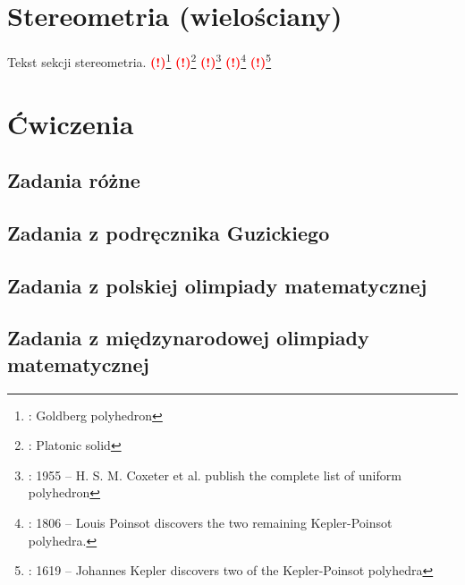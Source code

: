 \documentclass{greaseproof}
\newcommand{\todofoot}[1]{\textcolor{red}{\textbf{(!)}\footnote{\textbf{\color{red}{Do zrobienia}}: #1}}}
\begin{document}
\chapter{Stereometria (wielościany)}
Tekst sekcji stereometria.
\todofoot{Goldberg polyhedron} %
\todofoot{Platonic solid} %
\todofoot{1955 – H. S. M. Coxeter et al. publish the complete list of uniform polyhedron}
\todofoot{1806 – Louis Poinsot discovers the two remaining Kepler-Poinsot polyhedra.}
\todofoot{1619 – Johannes Kepler discovers two of the Kepler-Poinsot polyhedra}

\chapter{Ćwiczenia}
\section{Zadania różne}


\section{Zadania z podręcznika Guzickiego}


\section{Zadania z polskiej olimpiady matematycznej}


\section{Zadania z międzynarodowej olimpiady matematycznej}



{}


\raggedright
{}
\printindex

\printindex[persons]
\end{document}
